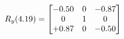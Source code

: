 \documentclass[preview]{standalone}
\begin{document}
\begin{align*}
\special{dvisvgm:raw <g id='unique000'>}R_{y}(4.19) = \begin{bmatrix}-0.50 & 0 & -0.87 \\0 & 1 & 0 \\+0.87 & 0 & -0.50\end{bmatrix}\special{dvisvgm:raw </g>}
\end{align*}
\end{document}

